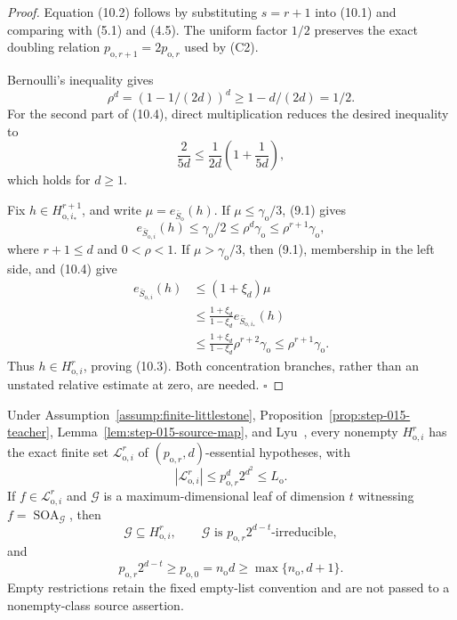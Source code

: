 \begin{proof}
Equation (10.2) follows by substituting \(s=r+1\) into (10.1) and comparing
with (5.1) and (4.5). The uniform factor \(1/2\) preserves the exact
doubling relation
\(p_{\mathrm o,r+1}=2p_{\mathrm o,r}\) used by (C2).

Bernoulli's inequality gives
\[
\rho^d=(1-1/(2d))^d\ge1-d/(2d)=1/2.
\]
For the second part of (10.4), direct multiplication reduces the desired
inequality to
\[
\frac{2}{5d}\le\frac1{2d}\left(1+\frac1{5d}\right),
\]
which holds for \(d\ge1\).

Fix \(h\in H_{\mathrm o,i_*}^{r+1}\), and write
\(\mu=e_{\bar S_{\mathrm o}}(h)\). If
\(\mu\le\gamma_{\mathrm o}/3\), (9.1) gives
\[
e_{\bar S_{\mathrm o,i}}(h)\le\gamma_{\mathrm o}/2
\le\rho^d\gamma_{\mathrm o}
\le\rho^{r+1}\gamma_{\mathrm o},
\]
where \(r+1\le d\) and \(0<\rho<1\). If
\(\mu>\gamma_{\mathrm o}/3\), then (9.1), membership in the left side,
and (10.4) give
\[
\begin{aligned}
e_{\bar S_{\mathrm o,i}}(h)
&\le(1+\xi_d)\mu\\
&\le\frac{1+\xi_d}{1-\xi_d}
e_{\bar S_{\mathrm o,i_*}}(h)\\
&\le\frac{1+\xi_d}{1-\xi_d}
\rho^{r+2}\gamma_{\mathrm o}
\le\rho^{r+1}\gamma_{\mathrm o}.
\end{aligned}
\]
Thus \(h\in H_{\mathrm o,i}^r\), proving (10.3). Both concentration
branches, rather than an unstated relative estimate at zero, are needed.
\(\square\)


\end{proof}

\begin{lemma}\label{lem:step-015-lists}
Under Assumption~\ref{assump:finite-littlestone},
Proposition~\ref{prop:step-015-teacher},
Lemma~\ref{lem:step-015-source-map}, and
Lyu~\citep[Claim~4.1, Definition~4.3, Lemmas~4.1 and~4.3, and
Corollary~4.1]{lyu2025}, every nonempty \(H_{\mathrm o,i}^r\) has the
exact finite set \(\mathcal L_{\mathrm o,i}^r\) of
\((p_{\mathrm o,r},d)\)-essential hypotheses, with
\[
|\mathcal L_{\mathrm o,i}^r|
\le p_{\mathrm o,r}^d2^{d^2}\le L_{\mathrm o}.
\tag{11.1}
\]
If \(f\in\mathcal L_{\mathrm o,i}^r\) and
\(\mathcal G\) is a maximum-dimensional leaf of dimension \(t\) witnessing
\(f=\operatorname{SOA}_{\mathcal G}\), then
\[
\mathcal G\subseteq H_{\mathrm o,i}^r,\qquad
\mathcal G\text{ is }
p_{\mathrm o,r}2^{d-t}\text{-irreducible},
\tag{11.2}
\]
and
\[
p_{\mathrm o,r}2^{d-t}\ge p_{\mathrm o,0}
=n_{\mathrm o}d\ge\max\{n_{\mathrm o},d+1\}.
\tag{11.3}
\]
Empty restrictions retain the fixed empty-list convention and are not
passed to a nonempty-class source assertion.


\end{lemma}

